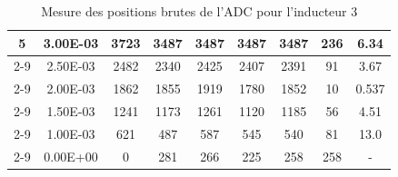 \begin{table}[H]
{\begin{tabular}{|c|c|c|c|c|c|c|c|c|}
            \multirow{6}{*}{5} & 3.00E-03         & 3723      & 3487                                                       & 3487                                                      & 3487                                                      & 3487    & 236    & 6.34                                                               \\ \cline{2-9}
                               & 2.50E-03         & 2482      & 2340                                                       & 2425                                                      & 2407                                                      & 2391    & 91     & 3.67                                                               \\ \cline{2-9}
                               & 2.00E-03         & 1862      & 1855                                                       & 1919                                                      & 1780                                                      & 1852    & 10     & 0.537                                                              \\ \cline{2-9}
                               & 1.50E-03         & 1241      & 1173                                                       & 1261                                                      & 1120                                                      & 1185    & 56     & 4.51                                                               \\ \cline{2-9}
                               & 1.00E-03         & 621       & 487                                                        & 587                                                       & 545                                                       & 540     & 81     & 13.0                                                               \\ \cline{2-9}
                               & 0.00E+00         & 0         & 281                                                        & 266                                                       & 225                                                       & 258     & 258    & -                                                                  \\ \hline
        \end{tabular}%
    }
    \caption{Mesure des positions brutes de l'ADC pour l'inducteur 3}
    \label{tab:adc_brut_inducteur3}
\end{table}

